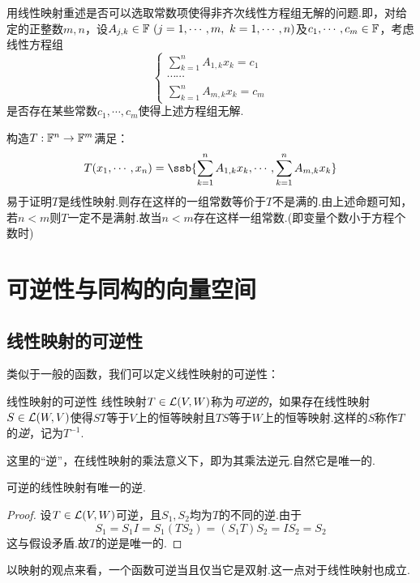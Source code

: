 \begin{example}
	用线性映射重述是否可以选取常数项使得非齐次线性方程组无解的问题.即，对给定的正整数$m,n$，设$A_{j,k} \in \mathbb{F} ~(j=1,\cdots ,m,~k=1,\cdots ,n)$及$c_1, \cdots ,c_m \in \mathbb{F}$，考虑线性方程组$$\begin{cases}
		\sum_{k=1}^{n} A_{1,k}x_k = c_1 \\
		\cdots \cdots \\
		\sum_{k=1}^{n} A_{m,k}x_k = c_m
	\end{cases}$$
	是否存在某些常数$c_1, \cdots ,c_m$使得上述方程组无解.
\end{example}
\begin{solution}
	构造$T:\mathbb{F} ^n \to \mathbb{F} ^m$满足：$$T(x_1, \cdots ,x_n) = \ssb{\sum_{k=1}^{n} A_{1,k}x_k, \cdots , \sum_{k=1}^{n} A_{m,k}x_k}$$
	易于证明$T$是线性映射.则存在这样的一组常数等价于$T$不是满的.由上述命题可知，若$n<m$则$T$一定不是满射.故当$n < m$存在这样一组常数.(即变量个数小于方程个数时)
\end{solution}


\newpage
\section{可逆性与同构的向量空间}

\subsection{线性映射的可逆性}

类似于一般的函数，我们可以定义线性映射的可逆性：

\begin{definition}{线性映射的可逆性}
	线性映射$T \in \mathcal{L} (V,W)$称为\textit{可逆的}，如果存在线性映射$S \in \mathcal{L} (W,V)$使得$ST$等于$V$上的恒等映射且$TS$等于$W$上的恒等映射.这样的$S$称作$T$的\textit{逆}，记为$T^{-1}$.
\end{definition}

这里的“逆”，在线性映射的乘法意义下，即为其乘法逆元.自然它是唯一的.

\begin{proposition}{}
	可逆的线性映射有唯一的逆.
\end{proposition}
\begin{proof}
	设$T \in \mathcal{L} (V,W)$可逆，且$S_1,S_2$均为$T$的不同的逆.由于$$S_1 = S_1I = S_1(TS_2) = (S_1T)S_2 = IS_2 = S_2$$
	这与假设矛盾.故$T$的逆是唯一的.
\end{proof}

以映射的观点来看，一个函数可逆当且仅当它是双射.这一点对于线性映射也成立.

